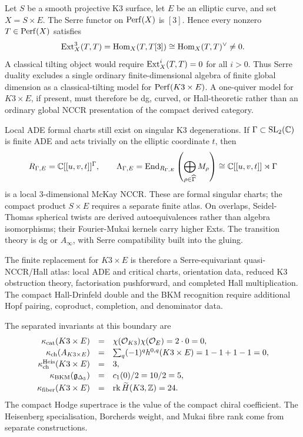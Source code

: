 Let \(S\) be a smooth projective K3 surface, let \(E\) be an elliptic
curve, and set \(X=S\times E\).  The Serre functor on \(\mathrm{Perf}(X)\) is
\([3]\).  Hence every nonzero \(T\in\mathrm{Perf}(X)\) satisfies
\[
  \mathrm{Ext}_X^3(T,T)
  =
  \mathrm{Hom}_X(T,T[3])
  \cong
  \mathrm{Hom}_X(T,T)^\vee
  \neq 0 .
\]
A classical tilting object would require
\(\mathrm{Ext}_X^i(T,T)=0\) for all \(i>0\).  Thus Serre duality excludes a
single ordinary finite-dimensional algebra of finite global dimension
as a classical-tilting model for \(\mathrm{Perf}(K3\times E)\).  A one-quiver
model for \(K3\times E\), if present, must therefore be dg, curved, or
Hall-theoretic rather than an ordinary global NCCR presentation of the
compact derived category.

Local ADE formal charts still exist on singular K3 degenerations.  If
\(\Gamma\subset\mathrm{SL}_2(\mathbb C)\) is finite ADE and acts trivially on
the elliptic coordinate \(t\), then
\[
  R_{\Gamma,E}=\mathbb C[[u,v,t]]^\Gamma,
  \qquad
  \Lambda_{\Gamma,E}
  =
  \mathrm{End}_{R_{\Gamma,E}}
  \left(\bigoplus_{\rho\in\widehat{\Gamma}}M_\rho\right)
  \cong
  \mathbb C[[u,v,t]]\rtimes\Gamma
\]
is a local \(3\)-dimensional McKay NCCR.  These are formal singular
charts; the compact product \(S\times E\) requires a separate finite
atlas.  On overlaps, Seidel-Thomas spherical twists are derived
autoequivalences rather than algebra isomorphisms; their Fourier-Mukai
kernels carry higher Exts.  The transition theory is dg or
\(A_\infty\), with Serre compatibility built into the gluing.

The finite replacement for \(K3\times E\) is therefore a
Serre-equivariant quasi-NCCR/Hall atlas: local ADE and critical charts,
orientation data, reduced K3 obstruction theory, factorisation
pushforward, and completed Hall multiplication.  The compact
Hall-Drinfeld double and the BKM recognition require additional Hopf
pairing, coproduct, completion, and denominator data.

The separated invariants at this boundary are
\[
\begin{array}{rcl}
  \kappa_{\mathrm{cat}}(K3\times E)
  &=&
  \chi(\mathcal O_{K3})\chi(\mathcal O_E)=2\cdot0=0,\\[2pt]
  \kappa_{\mathrm{ch}}(A_{K3\times E})
  &=&
  \sum_q(-1)^q h^{0,q}(K3\times E)=1-1+1-1=0,\\[2pt]
  \kappa_{\mathrm{ch}}^{\mathrm{Heis}}(K3\times E)
  &=&
  3,\\[2pt]
  \kappa_{\mathrm{BKM}}(\mathfrak g_{\Delta_5})
  &=&
  c_1(0)/2=10/2=5,\\[2pt]
  \kappa_{\mathrm{fiber}}(K3\times E)
  &=&
  \mathrm{rk}\,\widetilde H(K3,\mathbb Z)=24 .
\end{array}
\]
The compact Hodge supertrace is the value of the compact chiral
coefficient.  The Heisenberg specialisation, Borcherds weight, and
Mukai fibre rank come from separate constructions.

